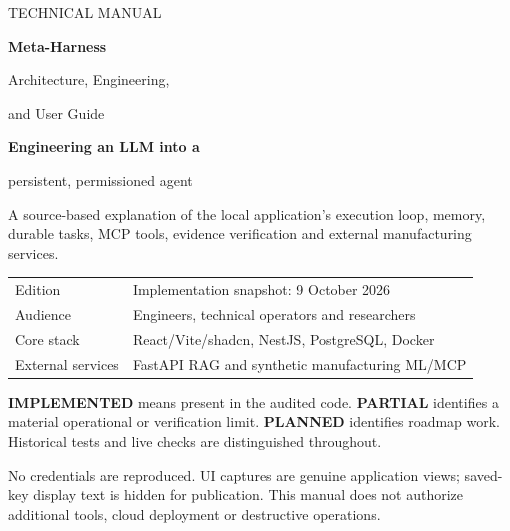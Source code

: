 \documentclass[a4paper,11pt,oneside]{report}
\newcommand{\note}[2]{\par\medskip{\sffamily\bfseries\color{teal}#1}\par #2\par}
\begin{document}
\begin{titlepage}
\thispagestyle{empty}
\vspace*{11mm}
{\sffamily\color{white}\small TECHNICAL MANUAL\par}
\vspace{6mm}
{\sffamily\color{white}\bfseries\fontsize{36}{40}\selectfont Meta-Harness\par}
\vspace{4mm}
{\sffamily\color{white}\fontsize{19}{25}\selectfont Architecture, Engineering,\par and User Guide\par}
\vspace{34mm}
{\sffamily\bfseries\Large Engineering an LLM into a\par persistent, permissioned agent\par}
\vspace{8mm}
A source-based explanation of the local application's execution loop, memory, durable tasks, MCP tools, evidence verification and external manufacturing services.\par
\vspace{9mm}
\begin{tabularx}{\linewidth}{@{}lX@{}}
\toprule
Edition & Implementation snapshot: 9 October 2026\\
Audience & Engineers, technical operators and researchers\\
Core stack & React/Vite/shadcn, NestJS, PostgreSQL, Docker\\
External services & FastAPI RAG and synthetic manufacturing ML/MCP\\
\bottomrule
\end{tabularx}
\vfill
\note{Reading convention}{\textbf{IMPLEMENTED} means present in the audited code. \textbf{PARTIAL} identifies a material operational or verification limit. \textbf{PLANNED} identifies roadmap work. Historical tests and live checks are distinguished throughout.}
\small\color{muted}No credentials are reproduced. UI captures are genuine application views; saved-key display text is hidden for publication. This manual does not authorize additional tools, cloud deployment or destructive operations.
\end{titlepage}
\end{document}
